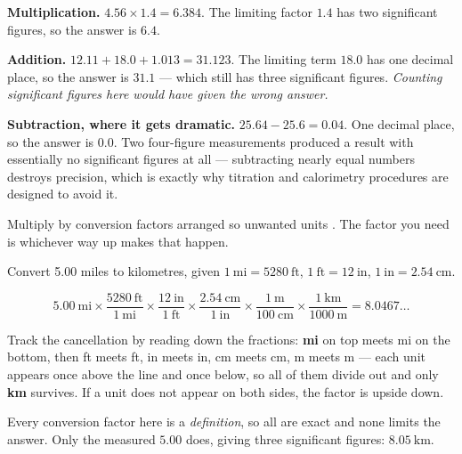 \documentclass{apchem-notes}
\begin{document}
\begin{workedexample}
\textbf{Multiplication.} $4.56 \times 1.4 = 6.384$. The limiting factor
$1.4$ has two significant figures, so the answer is $\mathbf{6.4}$.

\textbf{Addition.} $12.11 + 18.0 + 1.013 = 31.123$. The limiting term
$18.0$ has one decimal place, so the answer is $\mathbf{31.1}$ --- which
still has three significant figures. \emph{Counting significant figures
here would have given the wrong answer.}

\textbf{Subtraction, where it gets dramatic.}
$25.64 - 25.6 = 0.04$. One decimal place, so the answer is
$\mathbf{0.0}$. Two four-figure measurements produced a result with
essentially no significant figures at all --- subtracting nearly equal
numbers destroys precision, which is exactly why titration and
calorimetry procedures are designed to avoid it.
\end{workedexample}


Multiply by conversion factors arranged so unwanted units
. The factor you need is whichever way up makes
that happen.

\begin{workedexample}
Convert 5.00 miles to kilometres, given
$1~\text{mi} = 5280~\text{ft}$, $1~\text{ft} = 12~\text{in}$,
$1~\text{in} = 2.54~\text{cm}$.

\[ 5.00~\text{mi} \times
   \frac{5280~\text{ft}}{1~\text{mi}} \times
   \frac{12~\text{in}}{1~\text{ft}} \times
   \frac{2.54~\text{cm}}{1~\text{in}} \times
   \frac{1~\text{m}}{100~\text{cm}} \times
   \frac{1~\text{km}}{1000~\text{m}} = 8.0467\ldots \]

Track the cancellation by reading down the fractions: \textbf{mi} on top
meets mi on the bottom, then ft meets ft, in meets in, cm meets cm, m meets
m --- each unit appears once above the line and once below, so all of them
divide out and only \textbf{km} survives. If a unit does not appear on both
sides, the factor is upside down.

Every conversion factor here is a \emph{definition}, so all are exact and
none limits the answer. Only the measured $5.00$ does, giving three
significant figures: $\mathbf{8.05}~\text{km}$.
\end{workedexample}

\end{document}

